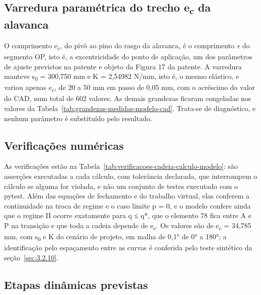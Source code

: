 \subsection{\texorpdfstring{Varredura paramétrica do trecho e\textsubscript{c} da alavanca}{Varredura paramétrica do trecho ec da alavanca}}\label{sec:3.2.11}

O comprimento e\textsubscript{c}, do pivô ao pino do rasgo da alavanca, é o comprimento \textit{e} do segmento OP, isto é, a excentricidade do ponto de aplicação, um dos parâmetros de ajuste previstos na patente e objeto da Figura 17 da patente. A varredura manteve s\textsubscript{0} = 300,750 mm e K = 2,54982 N/mm, isto é, o mesmo elástico, e variou apenas e\textsubscript{c}, de 20 a 50 mm em passo de 0,05 mm, com o acréscimo do valor do CAD, num total de 602 valores. As demais grandezas ficaram congeladas nos valores da Tabela~\ref{tab:grandezas-medidas-modelo-cad}. Trata-se de diagnóstico, e nenhum parâmetro é substituído pelo resultado.

\subsection{Verificações numéricas}\label{sec:3.2.12}

As verificações estão na Tabela~\ref{tab:verificacoes-cadeia-calculo-modelo}: são asserções executadas a cada cálculo, com tolerância declarada, que interrompem o cálculo se alguma for violada, e não um conjunto de testes executado com o pytest. Além das equações de fechamento e do trabalho virtual, elas conferem a continuidade na troca de regime e o caso limite p = 0, e o modelo confere ainda que o regime II ocorre exatamente para q ≤ q*, que o elemento 78 fica entre A e P na transição e que toda a cadeia depende de e\textsubscript{c}. Os valores são de e\textsubscript{c} = 34,785 mm, com s\textsubscript{0} e K do cenário de projeto, em malha de 0,1° de 0° a 180°; a identificação pelo espaçamento entre as curvas é conferida pelo teste sintético da seção~\ref{sec:3.2.10}.

\subsection{Etapas dinâmicas previstas}\label{sec:3.2.13}

